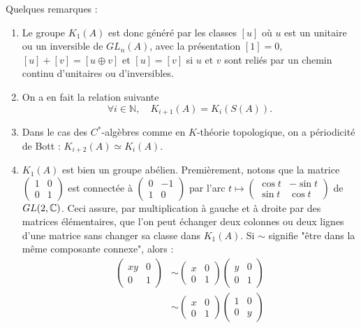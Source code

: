Quelques remarques : 
\begin{enumerate}
\item Le groupe $K_1(A)$ est donc généré par les classes $[u]$ où $u$ est un unitaire ou un inversible de $GL_n(A)$, avec la présentation $[1]=0$, $[u]+[v]=[u\oplus v]$ et $[u]=[v]$ si $u$ et $v$ sont reliés par un chemin continu d'unitaires ou d'inversibles.
\item On a en fait la relation suivante \[\forall i\in \mathbb N, \quad K_{i+1}(A)=K_i(S(A)).\]
\item Dans le cas des $C^*$-algèbres comme en $K$-théorie topologique, on a périodicité de Bott : $K_{i+2}(A)\simeq K_i(A)$.\\
\item $K_1(A)$ est bien un groupe abélien. Premièrement, notons que la matrice $\begin{pmatrix}1 & 0\\ 0 & 1\end{pmatrix}$ est connectée à  $\begin{pmatrix}0 & -1\\ 1 & 0\end{pmatrix}$ par l'arc $t\mapsto \begin{pmatrix}\cos t & -\sin t \\ \sin t  & \cos t\end{pmatrix}$ de $GL(2,\mathbb C)$. Ceci assure, par multiplication à gauche et à droite par des matrices élémentaires, que l'on peut échanger deux colonnes ou deux lignes d'une matrice sans changer sa classe dans $K_1(A)$. Si $\sim$ signifie "être dans la même composante connexe", alors :
\begin{align*}
\begin{pmatrix} xy & 0\\ 0 & 1\end{pmatrix} & \sim \begin{pmatrix} x & 0\\ 0 & 1\end{pmatrix} \begin{pmatrix}y & 0\\ 0 & 1\end{pmatrix}\\
							&\sim \begin{pmatrix}x & 0\\ 0 & 1\end{pmatrix} \begin{pmatrix}1 & 0\\ 0 & y\end{pmatrix}\\

\end{align*}
\end{enumerate}
